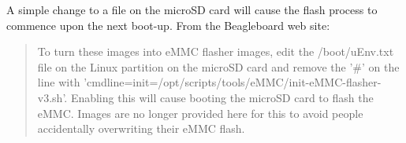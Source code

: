 A simple change to a file on the microSD card will cause the flash process to 
commence upon the next boot-up.  From the Beagleboard web site:

\begin{quotation}
To turn these images into eMMC flasher images, edit the /boot/uEnv.txt file on 
the Linux partition on the microSD card and remove the '\#' on the line with 
'cmdline=init=/opt/scripts/tools/eMMC/init-eMMC-flasher-v3.sh'. Enabling this 
will cause booting the microSD card to flash the eMMC. Images are no longer 
provided here for this to avoid people accidentally overwriting their eMMC 
flash.
\end{quotation}








